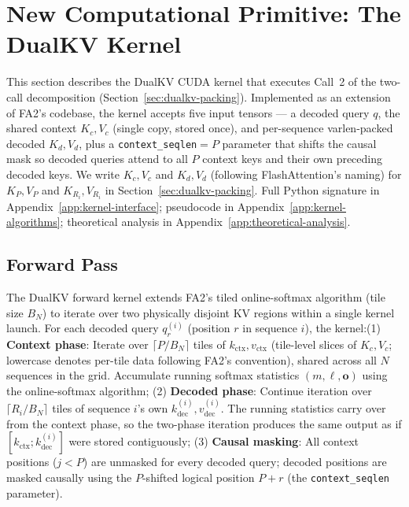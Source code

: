 \documentclass{article}
\begin{document}
\section{New Computational Primitive: The DualKV Kernel}
\label{sec:kernel}

This section describes the DualKV CUDA kernel that executes Call~2 of the two-call decomposition (Section~\ref{sec:dualkv-packing}). Implemented as an extension of FA2's codebase, the kernel accepts five input tensors --- a decoded query $q$, the shared context $K_c, V_c$ (single copy, stored once), and per-sequence varlen-packed decoded $K_d, V_d$, plus a \texttt{context\_seqlen}${}=P$ parameter that shifts the causal mask so decoded queries attend to all $P$ context keys and their own preceding decoded keys. We write $K_c, V_c$ and $K_d, V_d$ (following FlashAttention's naming) for $K_P, V_P$ and $K_{R_i}, V_{R_i}$ in Section~\ref{sec:dualkv-packing}. Full Python signature in Appendix~\ref{app:kernel-interface}; pseudocode in Appendix~\ref{app:kernel-algorithms}; theoretical analysis in Appendix~\ref{app:theoretical-analysis}.

\subsection{Forward Pass}
\label{sec:kernel-forward}

The DualKV forward kernel extends FA2's tiled online-softmax algorithm (tile size $B_N$) to iterate over two physically disjoint KV regions within a single kernel launch. For each decoded query $q_r^{(i)}$ (position $r$ in sequence $i$), the kernel:(1) \textbf{Context phase}: Iterate over $\lceil P / B_N \rceil$ tiles of $k_{\text{ctx}}, v_{\text{ctx}}$ (tile-level slices of $K_c, V_c$; lowercase denotes per-tile data following FA2's convention), shared across all $N$ sequences in the grid. Accumulate running softmax statistics $(m, \ell, \mathbf{o})$ using the online-softmax algorithm; (2) \textbf{Decoded phase}: Continue iteration over $\lceil R_i / B_N \rceil$ tiles of sequence $i$'s own $k_{\text{dec}}^{(i)}, v_{\text{dec}}^{(i)}$. The running statistics carry over from the context phase, so the two-phase iteration produces the same output as if $[k_{\text{ctx}}; k_{\text{dec}}^{(i)}]$ were stored contiguously; (3) \textbf{Causal masking}: All context positions ($j < P$) are unmasked for every decoded query; decoded positions are masked causally using the $P$-shifted logical position $P + r$ (the \texttt{context\_seqlen} parameter).
\end{document}
